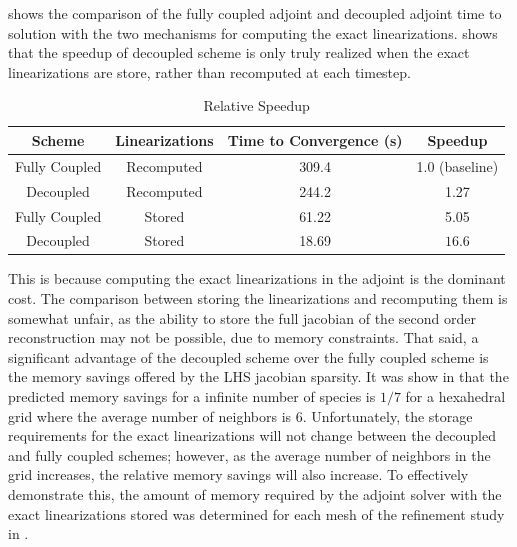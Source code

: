  shows the comparison of the fully coupled adjoint and 
decoupled adjoint time to solution with the two mechanisms for computing the
exact linearizations.   shows that the speedup of
decoupled scheme is only truly realized when the exact linearizations are store,
rather than recomputed at each timestep. 
\begin{table}[h]
  \centering
  \begin{tabular}{c|c|c|c}
    Scheme & Linearizations & Time to Convergence (s) & Speedup \\
    \hline
    Fully Coupled & Recomputed  & 309.4 & 1.0 (baseline)\\
    Decoupled     & Recomputed  & 244.2 & 1.27 \\
    Fully Coupled & Stored      & 61.22 & 5.05 \\
    Decoupled     & Stored      & 18.69 & $\mathbf{16.6}$ \\
  \end{tabular}
  \caption{Relative Speedup}
  \label{tab:srp-rel-speedup}
\end{table}
This is because computing the exact linearizations in the adjoint is the
dominant cost.  The comparison between storing the linearizations and
recomputing them is somewhat unfair, as the ability to store the full jacobian
of the second order reconstruction may not be possible, due to memory
constraints.  That said, a significant advantage of the decoupled scheme over
the fully coupled scheme is the memory savings offered by the LHS jacobian
sparsity. It was show in  that the
predicted memory savings for a infinite number of species is $1/7$ for a
hexahedral grid where the average number of neighbors is 6.  Unfortunately, the
storage requirements for the exact linearizations will not change between the
decoupled and fully coupled schemes; however, as the average number of neighbors
in the grid increases, the relative memory savings will also increase.  To
effectively demonstrate this, the amount of memory required by the adjoint
solver with the exact linearizations stored was determined for each mesh of the
refinement study in .
